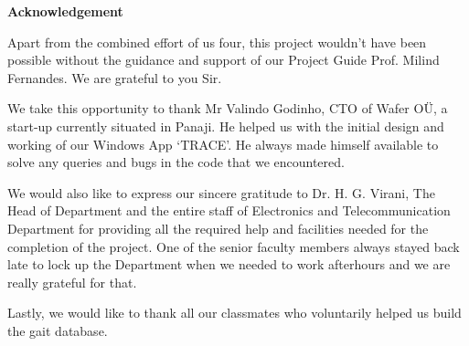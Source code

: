 \begin{center}
\begin{huge}
\bfseries{Acknowledgement}\\
\end{huge}
\end{center}
\vspace{1cm}

\noindent Apart from the combined effort of us four, this project wouldn’t have been possible without the guidance and support of our Project Guide Prof. Milind Fernandes. We are grateful to you Sir.

\noindent We take this opportunity to thank Mr Valindo Godinho, CTO of Wafer OÜ, a start-up currently situated in Panaji. He helped us with the initial design and working of our Windows App ‘TRACE’. He always made himself available to solve any queries and bugs in the code that we encountered.

\noindent We would also like to express our sincere gratitude to Dr. H. G. Virani, The Head of Department and the entire staff of Electronics and Telecommunication Department for providing all the required help and facilities needed for the completion of the project.
One of the senior faculty members always stayed back late to lock up the Department when we needed to work afterhours and we are really grateful for that. 

\noindent Lastly, we would like to thank all our classmates who voluntarily helped us build the gait database.







